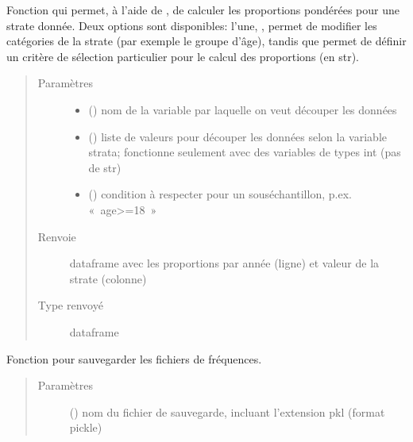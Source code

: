 \documentclass[letterpaper,10pt,french]{sphinxmanual}
\begin{document}
\begin{fulllineitems}
\begin{fulllineitems}
Fonction qui permet, à l’aide de , de calculer les proportions pondérées pour une strate donnée. Deux options sont disponibles: l’une, , permet de modifier les catégories de la strate (par exemple le groupe d’âge), tandis que  permet de définir un critère de sélection particulier pour le calcul des proportions (en str).
\begin{quote}\begin{description}
\item[{Paramètres}] \leavevmode\begin{itemize}
\item {} 
 () \textendash{} nom de la variable par laquelle on veut découper les données

\item {} 
 () \textendash{} liste de valeurs pour découper les données selon la variable strata; fonctionne seulement avec des variables de types int (pas de str)

\item {} 
 () \textendash{} condition à respecter pour un sous\sphinxhyphen{}échantillon, p.ex. « age\textgreater{}=18 »

\end{itemize}

\item[{Renvoie}] \leavevmode
dataframe avec les proportions par année (ligne) et valeur de la strate (colonne)

\item[{Type renvoyé}] \leavevmode
dataframe

\end{description}\end{quote}

\end{fulllineitems}


\begin{fulllineitems}
\label{\detokenize{code:simgen.statistics.save}}
Fonction pour sauvegarder les fichiers de fréquences.
\begin{quote}\begin{description}
\item[{Paramètres}] \leavevmode
{} () \textendash{} nom du fichier de sauvegarde, incluant l’extension pkl (format pickle)


\end{description}
\end{quote}
\end{fulllineitems}
\end{fulllineitems}
\end{document}
